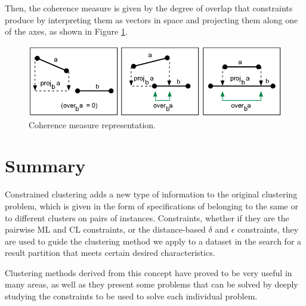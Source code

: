Then, the coherence measure is given by the degree of overlap that constraints produce by interpreting them as vectors in space and projecting them along one of the axes, as shown in Figure \ref{fig:CoherenceOverlap}.

\begin{figure}[!h]
	\centering
	\includegraphics[scale=0.4]{gfx/ConstClust/Coherencia/Coher2}
	\caption[Coherence measure representation.]{Coherence measure representation. \cite{davidson2007survey}}\label{fig:CoherenceOverlap}
\end{figure}

\section{Summary}

Constrained clustering adds a new type of information to the original clustering problem, which is given in the form of specifications of belonging to the same or to different clusters on pairs of instances. Constraints, whether if they are the pairwise \acf{ML} and \acf{CL} constraints, or the distance-based $\delta$ and $\epsilon$ constraints, they are used to guide the clustering method we apply to a dataset in the search for a result partition that meets certain desired characteristics.

Clustering methods derived from this concept have proved to be very useful in many areas, as well as they present some problems that can be solved by deeply studying the constraints to be used to solve each individual problem.


































